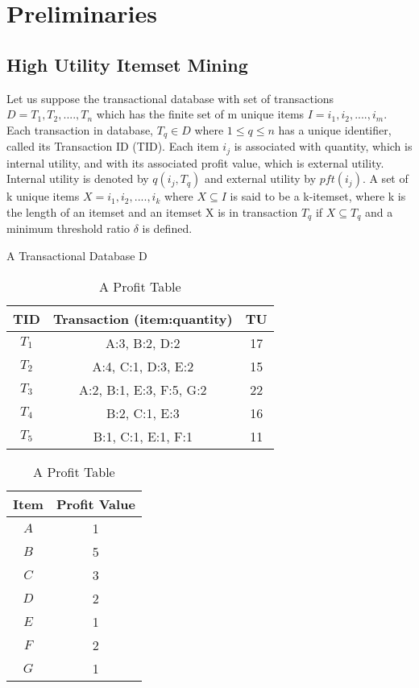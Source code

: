 \documentclass[11pt,openright]{report}
\begin{document}
\section{Preliminaries}\label{section:preliminaries}
\subsection{High Utility Itemset Mining}
Let us suppose the transactional database with set of transactions $D = {T_1, T_2, ...., T_n}$ which has the finite set of m unique items $I = {i_1, i_2, ...., i_m}$. Each transaction in database, $T_q \in D$ where $1 \leq q \leq n$ has a unique identifier, called its Transaction ID (TID). Each item $i_j$ is associated with quantity, which is internal utility, and with its associated profit value, which is external utility. Internal utility is denoted by $q(i_j, T_q)$ and external utility by $pft(i_j)$. A set of k unique items $X = {i_1, i_2, ...., i_k}$ where $X \subseteq I$ is said to be a k-itemset, where k is the length of an itemset and an itemset X is in transaction $T_q$ if $X \subseteq T_q$ and a minimum threshold ratio $\delta$ is defined.

\begin{table}[!t]
	\renewcommand{\arraystretch}{1.3}
	\caption{A Transactional Database D}
	\label{table:quantitative_db}
	\centering
	\begin{tabular}{|c||c||c|}
		\hline
		\bfseries TID & \bfseries Transaction (item:quantity) & \bfseries TU\\
		\hline\hline
		$T_1$ & A:3, B:2, D:2 & 17\\ \hline
		$T_2$ & A:4, C:1, D:3, E:2 & 15\\ \hline
		$T_3$ & A:2, B:1, E:3, F:5, G:2 & 22\\ \hline
		$T_4$ & B:2, C:1, E:3 & 16\\ \hline
		$T_5$ & B:1, C:1, E:1, F:1 & 11\\ \hline
	\end{tabular}
	
	\bigskip
	
	\renewcommand{\arraystretch}{1.3}
	\caption{A Profit Table}
	\label{table:profit_table}
	\centering
	\begin{tabular}{|c||c|}
		\hline
		\bfseries Item & \bfseries Profit Value\\
		\hline\hline
		$A$ & 1\\ \hline
		$B$ & 5 \\ \hline
		$C$ & 3\\ \hline
		$D$ & 2\\ \hline
		$E$ & 1\\ \hline
		$F$ & 2\\ \hline
		$G$ & 1\\ \hline
	\end{tabular}
\end{table}
\end{document}
